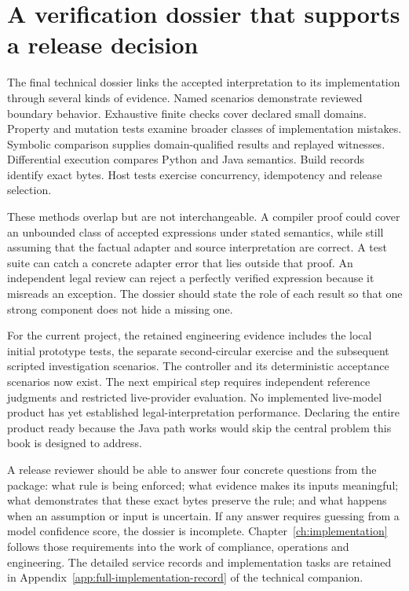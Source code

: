 \section{A verification dossier that supports a release decision}
\label{merge:M07:14}


The final technical dossier links the accepted interpretation to its implementation
through several kinds of evidence. Named scenarios demonstrate reviewed boundary
behavior. Exhaustive finite checks cover declared small domains. Property and
mutation tests examine broader classes of implementation mistakes. Symbolic
comparison supplies domain-qualified results and replayed witnesses. Differential
execution compares Python and Java semantics. Build records identify exact bytes.
Host tests exercise concurrency, idempotency and release selection.

These methods overlap but are not interchangeable. A compiler proof could cover
an unbounded class of accepted expressions under stated semantics, while still
assuming that the factual adapter and source interpretation are correct. A test
suite can catch a concrete adapter error that lies outside that proof. An
independent legal review can reject a perfectly verified expression because it
misreads an exception. The dossier should state the role of each result so that
one strong component does not hide a missing one.


For the current project, the retained engineering evidence includes the local
initial prototype tests, the separate second-circular exercise and the
subsequent scripted investigation scenarios. The controller and its deterministic
acceptance scenarios now exist. The next empirical step requires independent
reference judgments and restricted live-provider evaluation. No implemented
live-model product has yet established legal-interpretation performance. Declaring the entire product ready because the Java path works would
skip the central problem this book is designed to address.

A release reviewer should be able to answer four concrete questions from the
package: what rule is being enforced; what evidence makes its inputs meaningful;
what demonstrates that these exact bytes preserve the rule; and what happens when
an assumption or input is uncertain. If any answer requires guessing from a model
confidence score, the dossier is incomplete. Chapter~\ref{ch:implementation} follows those requirements into the work of
compliance, operations and engineering. The detailed service records and
implementation tasks are retained in Appendix~\ref{app:full-implementation-record} of the technical companion.
